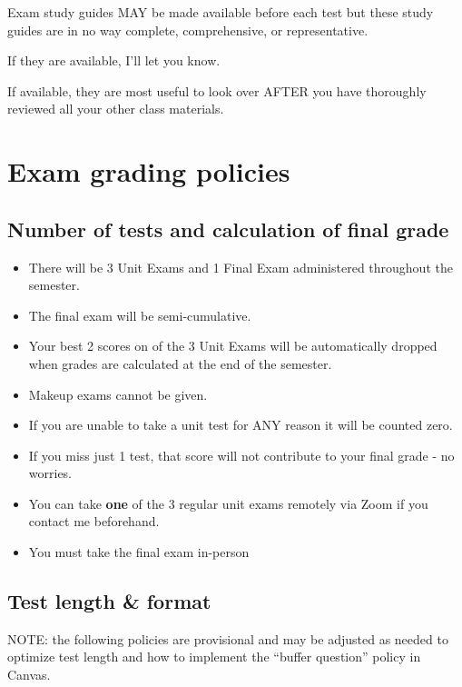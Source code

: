 \documentclass[
]{book}
\providecommand{\tightlist}{%
  \setlength{\itemsep}{0pt}\setlength{\parskip}{0pt}}
\begin{document}
Exam study guides MAY be made available before each test but these study guides are in no way complete, comprehensive, or representative.

If they are available, I'll let you know.

If available, they are most useful to look over AFTER you have thoroughly reviewed all your other class materials.

\hypertarget{exam-grading-policies}{%
\chapter{Exam grading policies}\label{exam-grading-policies}}

\hypertarget{number-of-tests-and-calculation-of-final-grade}{%
\section{Number of tests and calculation of final grade}\label{number-of-tests-and-calculation-of-final-grade}}

\begin{itemize}
\tightlist
\item
  There will be 3 Unit Exams and 1 Final Exam administered throughout the semester.
\item
  The final exam will be semi-cumulative.
\item
  Your best 2 scores on of the 3 Unit Exams will be automatically dropped when grades are calculated at the end of the semester.
\item
  Makeup exams cannot be given.
\item
  If you are unable to take a unit test for ANY reason it will be counted zero.
\item
  If you miss just 1 test, that score will not contribute to your final grade - no worries.
\item
  You can take \textbf{one} of the 3 regular unit exams remotely via Zoom if you contact me beforehand.
\item
  You must take the final exam in-person
\end{itemize}

\hypertarget{test-length-format}{%
\section{Test length \& format}\label{test-length-format}}

NOTE: the following policies are provisional and may be adjusted as needed to optimize test length and how to implement the ``buffer question'' policy in Canvas.
\end{document}
